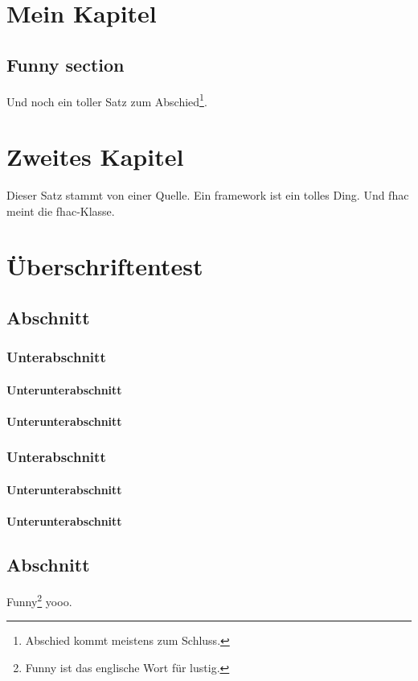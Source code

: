 \blinddocument

\chapter{Mein Kapitel}\label{ch:example1}
\section{Funny section}\label{sec:funny}
\Blindtext[5][3]

Und noch ein toller Satz zum Abschied\footnote{Abschied kommt meistens zum Schluss.}.

\Blindtext

\chapter{Zweites Kapitel}\label{ch:example2}
Dieser Satz stammt von einer Quelle.\cite{github}
Ein \Gls{framework} ist ein tolles Ding.
Und \ac{fhac} meint die \ac{fhac}-Klasse.

\chapter{Überschriftentest}\label{ch:example3}
\section{Abschnitt}\label{sec:example3}
\subsection{Unterabschnitt}\label{subsec:example3-1}
\subsubsection{Unterunterabschnitt}\label{subsubsec:example3-1-1}
\subsubsection{Unterunterabschnitt}\label{subsubsec:example3-1-2}
\subsection{Unterabschnitt}\label{subsec:example3-2}
\subsubsection{Unterunterabschnitt}\label{subsubsec:example3-2-1}
\subsubsection{Unterunterabschnitt}\label{subsubsec:example3-2-2}
\section{Abschnitt}\label{sec:example4}
Funny\footnote{Funny ist das englische Wort für lustig.} yooo.